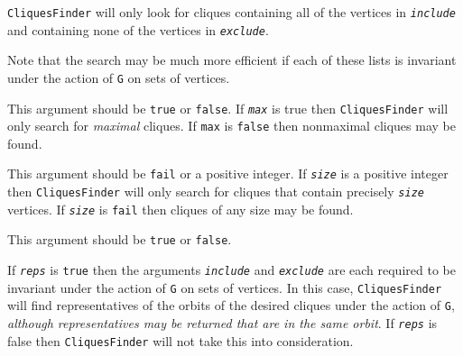 \documentclass[a4paper,11pt]{report}
\begin{document}
{{{\begin{description}
 \texttt{CliquesFinder} will only look for cliques containing all of the vertices in \mbox{\texttt{\mdseries\slshape include}} and containing none of the vertices in \mbox{\texttt{\mdseries\slshape exclude}}. 

 Note that the search may be much more efficient if each of these lists is
invariant under the action of \texttt{G} on sets of vertices. 
\item[{\mbox{\texttt{\mdseries\slshape max}}}]  This argument should be \texttt{true} or \texttt{false}. If \mbox{\texttt{\mdseries\slshape max}} is true then \texttt{CliquesFinder} will only search for \emph{maximal} cliques. If \texttt{max} is \texttt{false} then non\texttt{}maximal cliques may be found. 
\item[{\mbox{\texttt{\mdseries\slshape size}}}]  This argument should be \texttt{fail} or a positive integer. If \mbox{\texttt{\mdseries\slshape size}} is a positive integer then \texttt{CliquesFinder} will only search for cliques that contain precisely \mbox{\texttt{\mdseries\slshape size}} vertices. If \mbox{\texttt{\mdseries\slshape size}} is \texttt{fail} then cliques of any size may be found. 
\item[{\mbox{\texttt{\mdseries\slshape reps}}}]  This argument should be \texttt{true} or \texttt{false}.

 If \mbox{\texttt{\mdseries\slshape reps}} is \texttt{true} then the arguments \mbox{\texttt{\mdseries\slshape include}} and \mbox{\texttt{\mdseries\slshape exclude}} are each required to be invariant under the action of \texttt{G} on sets of vertices. In this case, \texttt{CliquesFinder} will find representatives of the orbits of the desired cliques under the
action of \texttt{G}, \emph{although representatives may be returned that are in the same orbit}. If \mbox{\texttt{\mdseries\slshape reps}} is false then \texttt{CliquesFinder} will not take this into consideration.


\end{description}}}}
\end{document}
